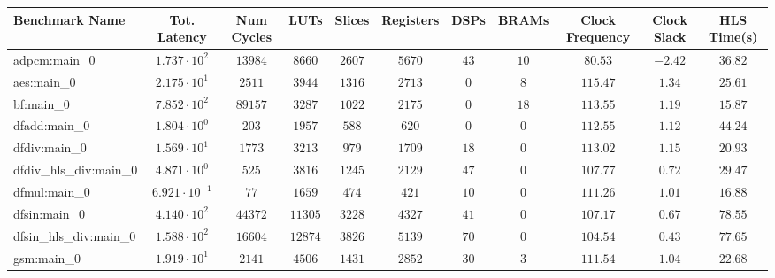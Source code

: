 \begin{tabular}{|l|c|c|c|c|c|c|c|c|c|c|}
\hline
Benchmark Name          & Tot. Latency            & Num Cycles & LUTs      & Slices    & Registers & DSPs    & BRAMs   & Clock Frequency & Clock Slack & HLS Time(s) \\
\hline
adpcm:main\_0           & $ 1.737 \cdot 10^{2}  $ & $ 13984  $ & $ 8660  $ & $ 2607  $ & $ 5670  $ & $ 43  $ & $ 10  $ & $ 80.53       $ & $ -2.42   $ & $ 36.82   $ \\
aes:main\_0             & $ 2.175 \cdot 10^{1}  $ & $ 2511   $ & $ 3944  $ & $ 1316  $ & $ 2713  $ & $ 0   $ & $ 8   $ & $ 115.47      $ & $ 1.34    $ & $ 25.61   $ \\
bf:main\_0              & $ 7.852 \cdot 10^{2}  $ & $ 89157  $ & $ 3287  $ & $ 1022  $ & $ 2175  $ & $ 0   $ & $ 18  $ & $ 113.55      $ & $ 1.19    $ & $ 15.87   $ \\
dfadd:main\_0           & $ 1.804 \cdot 10^{0}  $ & $ 203    $ & $ 1957  $ & $ 588   $ & $ 620   $ & $ 0   $ & $ 0   $ & $ 112.55      $ & $ 1.12    $ & $ 44.24   $ \\
dfdiv:main\_0           & $ 1.569 \cdot 10^{1}  $ & $ 1773   $ & $ 3213  $ & $ 979   $ & $ 1709  $ & $ 18  $ & $ 0   $ & $ 113.02      $ & $ 1.15    $ & $ 20.93   $ \\
dfdiv\_hls\_div:main\_0 & $ 4.871 \cdot 10^{0}  $ & $ 525    $ & $ 3816  $ & $ 1245  $ & $ 2129  $ & $ 47  $ & $ 0   $ & $ 107.77      $ & $ 0.72    $ & $ 29.47   $ \\
dfmul:main\_0           & $ 6.921 \cdot 10^{-1} $ & $ 77     $ & $ 1659  $ & $ 474   $ & $ 421   $ & $ 10  $ & $ 0   $ & $ 111.26      $ & $ 1.01    $ & $ 16.88   $ \\
dfsin:main\_0           & $ 4.140 \cdot 10^{2}  $ & $ 44372  $ & $ 11305 $ & $ 3228  $ & $ 4327  $ & $ 41  $ & $ 0   $ & $ 107.17      $ & $ 0.67    $ & $ 78.55   $ \\
dfsin\_hls\_div:main\_0 & $ 1.588 \cdot 10^{2}  $ & $ 16604  $ & $ 12874 $ & $ 3826  $ & $ 5139  $ & $ 70  $ & $ 0   $ & $ 104.54      $ & $ 0.43    $ & $ 77.65   $ \\
gsm:main\_0             & $ 1.919 \cdot 10^{1}  $ & $ 2141   $ & $ 4506  $ & $ 1431  $ & $ 2852  $ & $ 30  $ & $ 3   $ & $ 111.54      $ & $ 1.04    $ & $ 22.68   $ \\

\end{tabular}
